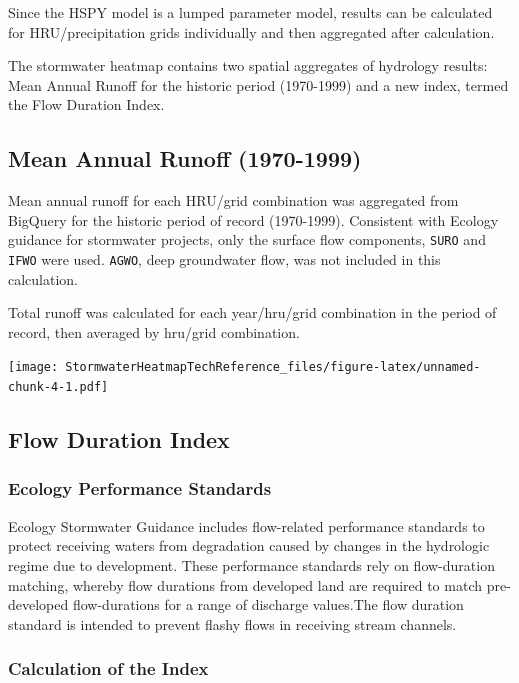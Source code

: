 \documentclass[
]{report}
\begin{document}
Since the HSPY model is a lumped parameter model, results can be calculated for HRU/precipitation grids individually and then aggregated after calculation.

The stormwater heatmap contains two spatial aggregates of hydrology results: Mean Annual Runoff for the historic period (1970-1999) and a new index, termed the Flow Duration Index.

\hypertarget{mean-annual-runoff-1970-1999}{%
\subsection{Mean Annual Runoff (1970-1999)}\label{mean-annual-runoff-1970-1999}}

Mean annual runoff for each HRU/grid combination was aggregated from BigQuery for the historic period of record (1970-1999). Consistent with Ecology guidance for stormwater projects, only the surface flow components, \texttt{SURO} and \texttt{IFWO} were used. \texttt{AGWO}, deep groundwater flow, was not included in this calculation.

Total runoff was calculated for each year/hru/grid combination in the period of record, then averaged by hru/grid combination.

\texttt{[image: StormwaterHeatmapTechReference\_files/figure-latex/unnamed-chunk-4-1.pdf]}

\hypertarget{flow-duration-index}{%
\subsection{Flow Duration Index}\label{flow-duration-index}}

\hypertarget{ecology-performance-standards}{%
\subsubsection{Ecology Performance Standards}\label{ecology-performance-standards}}

Ecology Stormwater Guidance includes flow-related performance standards to protect receiving waters from degradation caused by changes in the hydrologic regime due to development. These performance standards rely on flow-duration matching, whereby flow durations from developed land are required to match pre-developed flow-durations for a range of discharge values.The flow duration standard is intended to prevent flashy flows in receiving stream channels.

\hypertarget{calculation-of-the-index}{%
\subsubsection{Calculation of the Index}\label{calculation-of-the-index}}
\end{document}
